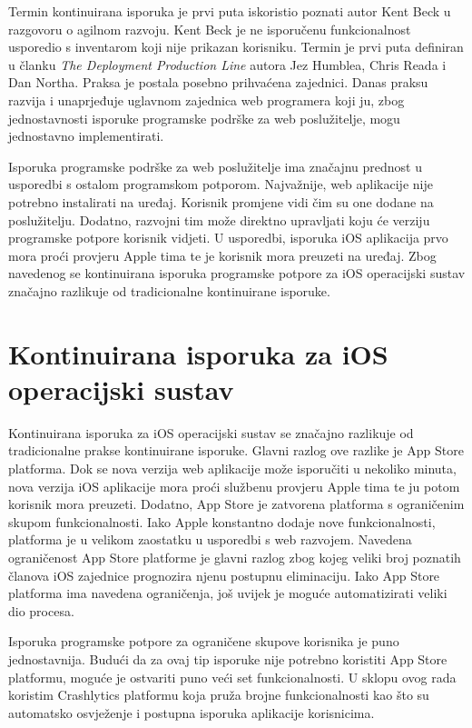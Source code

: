 \documentclass[times, utf8, diplomski, numeric]{fer}
\begin{document}
Termin kontinuirana isporuka je prvi puta iskoristio poznati autor Kent Beck u razgovoru o agilnom razvoju. Kent Beck je ne isporučenu funkcionalnost usporedio s inventarom koji nije prikazan korisniku. Termin je prvi puta definiran u članku \textit{The Deployment Production Line} autora Jez Humblea, Chris Reada i Dan Northa. Praksa je postala posebno prihvaćena zajednici. Danas praksu razvija i unaprjeđuje uglavnom zajednica web programera koji ju, zbog jednostavnosti isporuke programske podrške za web poslužitelje, mogu jednostavno implementirati.

Isporuka programske podrške za web poslužitelje ima značajnu prednost u usporedbi s ostalom programskom potporom. Najvažnije, web aplikacije nije potrebno instalirati na uređaj. Korisnik promjene vidi čim su one dodane na poslužitelju. Dodatno, razvojni tim može direktno upravljati koju će verziju programske potpore korisnik vidjeti. U usporedbi, isporuka iOS aplikacija prvo mora proći provjeru Apple tima te je korisnik mora preuzeti na uređaj. Zbog navedenog se kontinuirana isporuka programske potpore za iOS operacijski sustav značajno razlikuje od tradicionalne kontinuirane isporuke.


\section{Kontinuirana isporuka za iOS operacijski sustav}

Kontinuirana isporuka za iOS operacijski sustav se značajno razlikuje od tradicionalne prakse kontinuirane isporuke. Glavni razlog ove razlike je App Store platforma. Dok se nova verzija web aplikacije može isporučiti u nekoliko minuta, nova verzija iOS aplikacije mora proći službenu provjeru Apple tima te ju potom korisnik mora preuzeti. Dodatno, App Store je zatvorena platforma s ograničenim skupom funkcionalnosti. Iako Apple konstantno dodaje nove funkcionalnosti, platforma je u velikom zaostatku u usporedbi s web razvojem. Navedena ograničenost App Store platforme je glavni razlog zbog kojeg veliki broj poznatih članova iOS zajednice prognozira njenu postupnu eliminaciju. Iako App Store platforma ima navedena ograničenja, još uvijek je moguće automatizirati veliki dio procesa.

Isporuka programske potpore za ograničene skupove korisnika je puno jednostavnija. Budući da za ovaj tip isporuke nije potrebno koristiti App Store platformu, moguće je ostvariti puno veći set funkcionalnosti. U sklopu ovog rada koristim Crashlytics platformu koja pruža brojne funkcionalnosti kao što su automatsko osvježenje i postupna isporuka aplikacije korisnicima.
\end{document}
